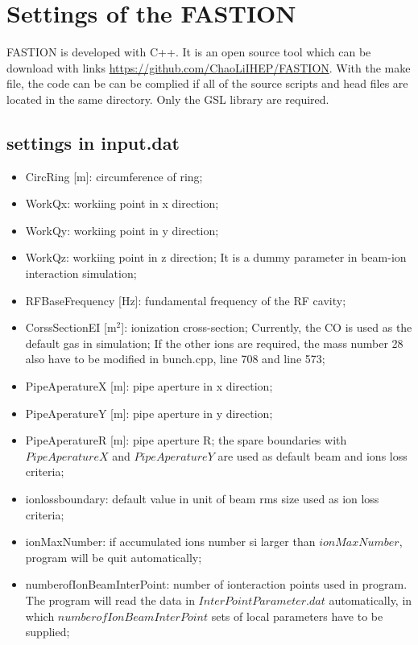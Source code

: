 \documentclass[aps,prab,reprint,superscriptaddress,showpacs,showkeys,letter]{revtex4-1}
\begin{document}
\section{Settings of the FASTION}
FASTION is developed with C++. It is an open source tool which can be download with links \url{https://github.com/ChaoLiIHEP/FASTION}. With the make file, the code can be  can be complied if all of the source scripts and head files are located in the same directory. Only the GSL \cite{22} library are required. 

\subsection{settings in input.dat}



\begin{itemize}
\item CircRing [m]: circumference of ring; 
\item WorkQx: workiing point in x direction; 
\item WorkQy: workiing point in y direction;
\item WorkQz: workiing point in z direction; It is a dummy parameter in beam-ion interaction simulation;
\item RFBaseFrequency [Hz]: fundamental frequency of the RF cavity;
\item CorssSectionEI [m$^2$]: ionization cross-section; Currently, the CO is used as the default gas in simulation; If the other ions are required, the mass number 28 also have to be modified in bunch.cpp, line 708 and line 573;
\item PipeAperatureX [m]: pipe aperture in x direction;
\item PipeAperatureY [m]: pipe aperture in y direction;
\item PipeAperatureR [m]: pipe aperture R; 
the spare boundaries with $PipeAperatureX$ and $PipeAperatureY$ are used as default beam and ions loss criteria;
\item ionlossboundary: default value in unit of beam rms size used as  ion loss   criteria;
\item ionMaxNumber: if accumulated ions number si larger than  $ionMaxNumber$, program will be quit automatically;
\item numberofIonBeamInterPoint: number of ionteraction points used in program. The program will read the data in $InterPointParameter.dat$ automatically, in which $numberofIonBeamInterPoint$ sets of local parameters have to be supplied; 

\end{itemize}
\end{document}
